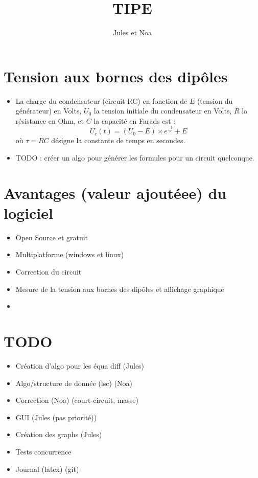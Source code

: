 \documentclass[11pt]{article}
\begin{document}
    \title{TIPE}
    \author{Jules et Noa}
    \maketitle
    \section{Tension aux bornes des dipôles}\label{sec:i}

    \begin{itemize}
    \item La charge du condensateur (circuit RC) en fonction de \(E\) (tension du générateur) en Volts, \(U_{0}\) la tension initiale du condensateur en Volts, \(R\) la résistance en Ohm, et \(C\) la capacité en Farads est :
    \[
        U_{c}(t) = (U_{0}-E) \times e^{\frac{-t}{\tau}} + E
    \]
         où \(\tau = RC\) désigne la constante de temps en secondes.
        \item TODO : créer un algo pour générer les formules pour un circuit quelconque.

\end{itemize}
    \section{Avantages (valeur ajoutéee) du logiciel}
    \begin{itemize}
        \item Open Source et gratuit
        \item Multiplatforme (windows et linux)
        \item Correction du circuit
        \item Mesure de la tension aux bornes des dipôles et affichage graphique
        \item
\end{itemize}
    \section{TODO}
    \begin{itemize}
        \item Création d'algo pour les équa diff (Jules)
        \item Algo/structure de donnée (lsc) (Noa)
        \item Correction (Noa) (court-circuit, masse)
        \item GUI (Jules (pas priorité))
        \item Création des graphs (Jules)
        \item Tests concurrence
        \item Journal (latex) (git)
    \end{itemize}
\end{document}

